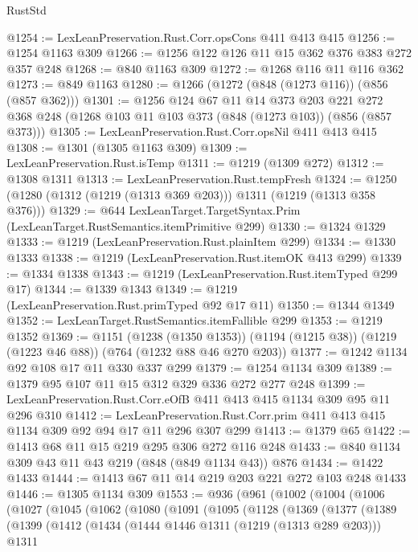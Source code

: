 \begin{lexlean}{RustStd}
\begin{coremodule}
{\begin{coremodule}
{{{{{{@1254 := LexLeanPreservation.Rust.Corr.opsCons @411 @413 @415
@1256 := @1254 @1163 @309
@1266 := @1256 @122 @126 @11 @15 @362 @376 @383 @272 @357 @248
@1268 := @840 @1163 @309
@1272 := @1268 @116 @11 @116 @362
@1273 := @849 @1163
@1280 := @1266 (@1272 (@848 (@1273 @116)) (@856 (@857 @362)))
@1301 := @1256
    @124
    @67
    @11
    @14
    @373
    @203
    @221
    @272
    @368
    @248
    (@1268 @103 @11 @103 @373 (@848 (@1273 @103)) (@856 (@857 @373)))
@1305 := LexLeanPreservation.Rust.Corr.opsNil @411 @413 @415
@1308 := @1301 (@1305 @1163 @309)
@1309 := LexLeanPreservation.Rust.isTemp
@1311 := @1219 (@1309 @272)
@1312 := @1308 @1311
@1313 := LexLeanPreservation.Rust.tempFresh
@1324 := @1250 (@1280 (@1312 (@1219 (@1313 @369 @203))) @1311 (@1219 (@1313 @358 @376)))
@1329 := @644 LexLeanTarget.TargetSyntax.Prim (LexLeanTarget.RustSemantics.itemPrimitive @299)
@1330 := @1324 @1329
@1333 := @1219 (LexLeanPreservation.Rust.plainItem @299)
@1334 := @1330 @1333
@1338 := @1219 (LexLeanPreservation.Rust.itemOK @413 @299)
@1339 := @1334 @1338
@1343 := @1219 (LexLeanPreservation.Rust.itemTyped @299 @17)
@1344 := @1339 @1343
@1349 := @1219 (LexLeanPreservation.Rust.primTyped @92 @17 @11)
@1350 := @1344 @1349
@1352 := LexLeanTarget.RustSemantics.itemFallible @299
@1353 := @1219 @1352
@1369 := @1151
    (@1238 (@1350 @1353))
    (@1194 (@1215 @38))
    (@1219 (@1223 @46 @88))
    (@764 (@1232 @88 @46 @270 @203))
@1377 := @1242 @1134 @92 @108 @17 @11 @330 @337 @299
@1379 := @1254 @1134 @309
@1389 := @1379 @95 @107 @11 @15 @312 @329 @336 @272 @277 @248
@1399 := LexLeanPreservation.Rust.Corr.eOfB @411 @413 @415 @1134 @309 @95 @11 @296 @310
@1412 := LexLeanPreservation.Rust.Corr.prim @411 @413 @415 @1134 @309 @92 @94 @17 @11 @296 @307 @299
@1413 := @1379 @65
@1422 := @1413 @68 @11 @15 @219 @295 @306 @272 @116 @248
@1433 := @840 @1134 @309 @43 @11 @43 @219 (@848 (@849 @1134 @43)) @876
@1434 := @1422 @1433
@1444 := @1413 @67 @11 @14 @219 @203 @221 @272 @103 @248 @1433
@1446 := @1305 @1134 @309
@1553 := @936
    (@961
      (@1002
        (@1004
          (@1006
            (@1027
              (@1045
                (@1062
                  (@1080
                    (@1091
                      (@1095
                        (@1128
                          (@1369
                            (@1377
                              (@1389
                                (@1399
                                  (@1412
                                    (@1434
                                      (@1444 @1446 @1311 (@1219 (@1313 @289 @203)))
                                      @1311
}}}}}}
\end{coremodule}}
\end{coremodule}
\end{lexlean}
